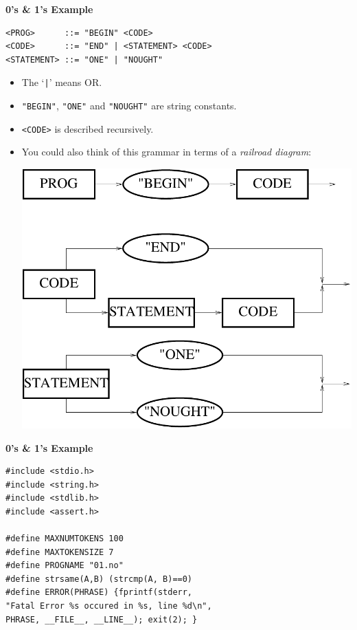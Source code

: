 \documentclass[a4,portraitt]{slides}
\begin{document}
{{\newpage
{\samepage
\begin{center}
{\Large{\bf 0's \& 1's Example}}
\end{center}
{\small
\begin{verbatim}
<PROG>      ::= "BEGIN" <CODE>
<CODE>      ::= "END" | <STATEMENT> <CODE>
<STATEMENT> ::= "ONE" | "NOUGHT"
\end{verbatim}
\begin{itemize}
\item The `\verb^|^' means OR.
\item \verb^"BEGIN"^, \verb^"ONE"^ and \verb^"NOUGHT"^ are string constants.
\item \verb^<CODE>^ is described recursively.
\item You could also think of this grammar in terms of a {\it railroad diagram}:
\begin{center}
\includegraphics{../Images/railroad.pdf}
\end{center}
\end{itemize}
}}

\newpage
{\samepage
\begin{center}
{\Large{\bf 0's \& 1's Example}}
\end{center}
\begin{verbatim}
#include <stdio.h>
#include <string.h>
#include <stdlib.h>
#include <assert.h>

#define MAXNUMTOKENS 100
#define MAXTOKENSIZE 7
#define PROGNAME "01.no"
#define strsame(A,B) (strcmp(A, B)==0)
#define ERROR(PHRASE) {fprintf(stderr,
"Fatal Error %s occured in %s, line %d\n",
PHRASE, __FILE__, __LINE__); exit(2); }


\end{verbatim}}}}
\end{document}

